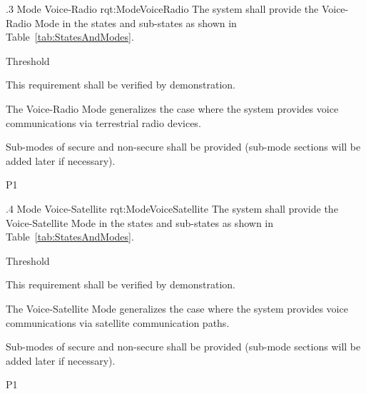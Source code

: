 \ONERQMTVKSA
{\RqtNumberBase.3}
{Mode Voice-Radio}
{rqt:ModeVoiceRadio}
{The system shall provide the Voice-Radio Mode in the states and sub-states as shown in Table~\ref{tab:StatesAndModes}.}
{
	\item [Phase 1] Threshold
}
{This requirement shall be verified by demonstration.}
{
	\item The Voice-Radio Mode generalizes the case where the system provides voice communications via terrestrial radio devices.
	\item Sub-modes of secure and non-secure shall be provided (sub-mode sections will be added later if necessary).
}
{P1}


\ONERQMTVKSA
{\RqtNumberBase.4}
{Mode Voice-Satellite}
{rqt:ModeVoiceSatellite}
{The system shall provide the Voice-Satellite Mode in the states and sub-states as shown in Table~\ref{tab:StatesAndModes}.}
{
	\item [Phase 1] Threshold
}
{This requirement shall be verified by demonstration.}
{
	\item The Voice-Satellite Mode generalizes the case where the system provides voice communications via satellite communication paths.
	\item Sub-modes of secure and non-secure shall be provided (sub-mode sections will be added later if necessary).
}
{P1}



